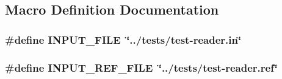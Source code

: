 \subsection{Macro Definition Documentation}
\hypertarget{test-reader_8c_a2a3ad4ebb43e29f804a1e524aca840b2}{
\subsubsection[{I\+N\+P\+U\+T\+\_\+\+F\+I\+L\+E}]{\setlength{\rightskip}{0pt plus 5cm}\#{\bf define} I\+N\+P\+U\+T\+\_\+\+F\+I\+L\+E~\char`\"{}../tests/{\bf test}-\/reader.\+in\char`\"{}}}\label{test-reader_8c_a2a3ad4ebb43e29f804a1e524aca840b2}
\hypertarget{test-reader_8c_a43e9fc259556970183f22f223a403250}{
\subsubsection[{I\+N\+P\+U\+T\+\_\+\+R\+E\+F\+\_\+\+F\+I\+L\+E}]{\setlength{\rightskip}{0pt plus 5cm}\#{\bf define} I\+N\+P\+U\+T\+\_\+\+R\+E\+F\+\_\+\+F\+I\+L\+E~\char`\"{}../tests/{\bf test}-\/reader.\+ref\char`\"{}}}\label{test-reader_8c_a43e9fc259556970183f22f223a403250}


